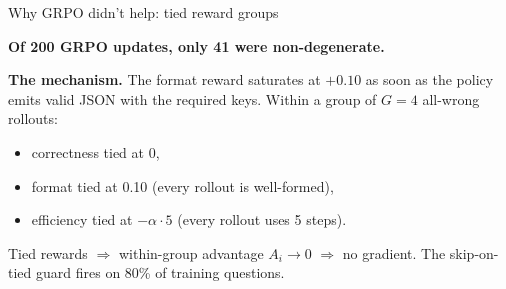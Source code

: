 \documentclass[aspectratio=169]{beamer}
\begin{document}
\begin{frame}{Why GRPO didn't help: tied reward groups}

\textbf{Of 200 GRPO updates, only 41 were non-degenerate.}

\begin{center}
\end{center}

\textbf{The mechanism.} The format reward saturates at $+0.10$ as
soon as the policy emits valid JSON with the required keys.
Within a group of $G{=}4$ all-wrong rollouts:
\begin{itemize}
  \item correctness tied at 0,
  \item format tied at 0.10 (every rollout is well-formed),
  \item efficiency tied at $-\alpha\cdot 5$ (every rollout uses 5 steps).
\end{itemize}
Tied rewards $\Rightarrow$ within-group advantage $A_i \to 0$
$\Rightarrow$ \alert{no gradient}. The skip-on-tied guard fires on 80\% of training questions.

\end{frame}
\end{document}

